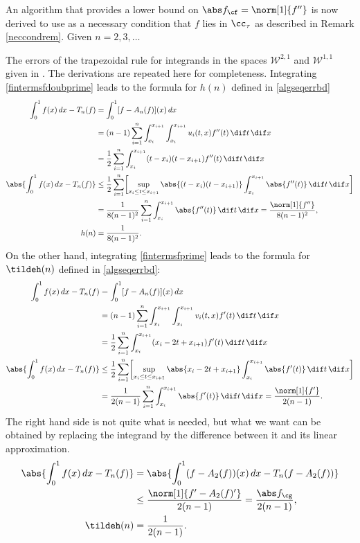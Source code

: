 An algorithm that provides a lower bound on $\Fnorm{f}=\norm[1]{f''}$ is now derived to use as a necessary condition that $f$ lies in $\cc_\tau$ as described in Remark \ref{neccondrem}.  Given $n =2, 3, \ldots$

The errors of the trapezoidal rule for integrands in the spaces $\mathcal{W}^{2,1}$ and $\mathcal{W}^{1,1}$ given in \cite[(7.14) and (7.15)]{BraPet11a}. The derivations are repeated here for completeness. Integrating \eqref{fintermsfdoubprime} leads to the formula for $h(n)$ defined in \eqref{algseqerrbd}
\begin{align*}
\int_0^1 f(x) \, dx - T_n(f) & = \int_0^ 1 [f-A_n (f)](x) \, dx\\
& = (n-1) \sum_{i=1}^n \int_{x_i}^{x_{i+1}} \int_{x_i}^{x_{i+1}} u_i(t,x) f''(t) \, \dif t \, \dif x \\
& = \frac{1}{2} \sum_{i=1}^n \int_{x_i}^{x_{i+1}} (t-x_i)(t-x_{i+1}) f''(t) \, \dif t \, \dif x \\
\abs{\int_0^1 f(x) \, dx - T_n(f)} & \le \frac{1}{2} \sum_{i=1}^n \biggl [\sup_{x_i \le t \le x_{i+1}} \abs{(t-x_i)(t-x_{i+1})} \int_{x_i}^{x_{i+1}} \abs{f''(t)} \, \dif t \, \dif x \biggr ] \\
& = \frac{1}{8(n-1)^2} \sum_{i=1}^n \int_{x_i}^{x_{i+1}} \abs{f''(t)} \, \dif t \, \dif x = \frac{\norm[1]{f''}}{8(n-1)^2}, \\
h(n)&= \frac{1}{8(n-1)^2}.
\end{align*}
On the other hand, integrating \eqref{fintermsfprime} leads to the formula for $\tildeh(n)$ defined in \eqref{algseqerrbd}:
\begin{align*}
\int_0^1 f(x) \, dx - T_n(f) & = \int_0^ 1 [f-A_n (f)](x) \, dx\\
& = (n-1) \sum_{i=1}^n \int_{x_i}^{x_{i+1}} \int_{x_i}^{x_{i+1}} v_i(t,x) f'(t) \, \dif t \, \dif x \\
& = \frac{1}{2} \sum_{i=1}^n \int_{x_i}^{x_{i+1}} (x_i-2t+x_{i+1}) f'(t) \, \dif t \, \dif x \\
\abs{\int_0^1 f(x) \, dx - T_n(f)} & \le \frac{1}{2} \sum_{i=1}^n \biggl [\sup_{x_i \le t \le x_{i+1}} \abs{x_i-2t+x_{i+1}} \int_{x_i}^{x_{i+1}} \abs{f'(t)} \, \dif t \, \dif x \biggr ] \\
& = \frac{1}{2(n-1)} \sum_{i=1}^n \int_{x_i}^{x_{i+1}} \abs{f'(t)} \, \dif t \, \dif x = \frac{\norm[1]{f'}}{2(n-1)}.
\end{align*}
The right hand side is not quite what is needed, but what we want can be obtained by replacing the integrand by the difference between it and its linear approximation.
\begin{align*}
\abs{\int_0^1 f(x) \, dx - T_n(f)} & =\abs{\int_0^1 (f-A_2(f))(x) \, dx - T_n(f-A_2(f))} \\
&\le \frac{\norm[1]{f'-A_2(f)'}}{2(n-1)}=\frac{\Gnorm{f}}{2(n-1)}, \\
\tildeh(n)&= \frac{1}{2(n-1)}.
\end{align*}

